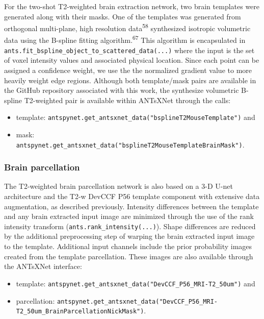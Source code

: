 \documentclass[
  12pt,
]{article}
\begin{document}
For the two-shot T2-weighted brain extraction network, two brain
templates were generated along with their masks. One of the templates
was generated from orthogonal multi-plane, high resolution
data\textsuperscript{58} synthesized isotropic volumetric data using the
B-spline fitting algorithm.\textsuperscript{67} This algorithm is
encapsulated in
\texttt{ants.fit\_bspline\_object\_to\_scattered\_data(...)} where the
input is the set of voxel intensity values and associated physical
location. Since each point can be assigned a confidence weight, we use
the the normalized gradient value to more heavily weight edge regions.
Although both template/mask pairs are available in the GitHub repository
associated with this work, the synthesize volumetric B-spline
T2-weighted pair is available within ANTsXNet through the calls:

\begin{itemize}
\item
  template:
  \texttt{antspynet.get\_antsxnet\_data("bsplineT2MouseTemplate")} and
\item
  mask:
  \texttt{antspynet.get\_antsxnet\_data("bsplineT2MouseTemplateBrainMask")}.
\end{itemize}

\hypertarget{brain-parcellation}{%
\subsubsection{Brain parcellation}\label{brain-parcellation}}

The T2-weighted brain parcellation network is also based on a 3-D U-net
architecture and the T2-w DevCCF P56 template component with extensive
data augmentation, as described previously. Intensity differences
between the template and any brain extracted input image are minimized
through the use of the rank intensity transform
(\texttt{ants.rank\_intensity(...)}). Shape differences are reduced by
the additional preprocessing step of warping the brain extracted input
image to the template. Additional input channels include the prior
probability images created from the template parcellation. These images
are also available through the ANTsXNet interface:

\begin{itemize}
\item
  template:
  \texttt{antspynet.get\_antsxnet\_data("DevCCF\_P56\_MRI-T2\_50um")}
  and
\item
  parcellation:
  \texttt{antspynet.get\_antsxnet\_data("DevCCF\_P56\_MRI-T2\_50um\_BrainParcellationNickMask")}.
\end{itemize}
\end{document}
